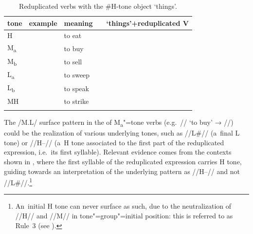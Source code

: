 \begin{table}[t]
	\caption{\label{tab:reduplicatedverbswiththehtoneobjectthings}Reduplicated verbs with the \#H-tone object ‘things’.}
	\begin{tabularx}{\textwidth}{ l@{\hspace{6mm}} l@{\hspace{6mm}} l@{\hspace{6mm}} l@{\hspace{6mm}} Q }
		\lsptoprule
		tone & example & meaning &  & ‘things’+reduplicated V\\ \midrule
		H &  & to eat &  & \\
		M\textsubscript{a} &  & to buy &  & \\
		M\textsubscript{b} &  & to sell &  & \\
		L\textsubscript{a} &  & to sweep &  & \\
		L\textsubscript{b} &  & to speak &  & \\
		MH &  & to strike &  & \\
		\lspbottomrule
	\end{tabularx}
\end{table}

\newpage
The /M.L/ surface pattern in the  of M\textsubscript{a}"=tone verbs (e.g.~// ‘to buy’ → //) could be the realization of various underlying tones, such as //L\#// (a~final L tone) or //H--// (a~H tone associated to the first part of the reduplicated expression, i.e.\ its first syllable). Relevant evidence comes from the contexts shown in , where the first syllable of the reduplicated expression carries H tone, guiding towards an interpretation of the underlying pattern as //H--// and not //L\#//.\footnote{An~initial H tone can never surface as such, due to the {neutralization} of //H// and \mbox{//M//} in tone"=group"=initial position: this is referred to as Rule~3 (see ).}

